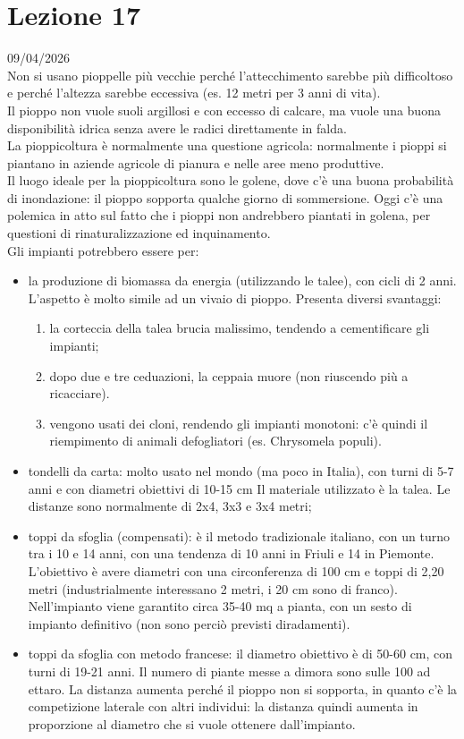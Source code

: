 \section{Lezione 17} \hfill 09/04/2026\\
Non si usano pioppelle più vecchie perché l'attecchimento sarebbe più difficoltoso e perché l'altezza sarebbe eccessiva (es. 12 metri per 3 anni di vita).\\
Il pioppo non vuole suoli argillosi e con eccesso di calcare, ma vuole una buona disponibilità idrica senza avere le radici direttamente in falda.\\
La pioppicoltura è normalmente una questione agricola: normalmente i pioppi si piantano in aziende agricole di pianura e nelle aree meno produttive.\\
Il luogo ideale per la pioppicoltura sono le golene, dove c'è una buona probabilità di inondazione: il pioppo sopporta qualche giorno di sommersione. Oggi c'è una polemica in atto sul fatto che i pioppi non andrebbero piantati in golena, per questioni di rinaturalizzazione ed inquinamento.\\
Gli impianti potrebbero essere per:
\begin{itemize}[nosep]
    \item la produzione di biomassa da energia (utilizzando le talee), con cicli di 2 anni. L'aspetto è molto simile ad un vivaio di pioppo. Presenta diversi svantaggi:
    \begin{enumerate}[nosep]
        \item la corteccia della talea brucia malissimo, tendendo a cementificare gli impianti;
        \item dopo due e tre ceduazioni, la ceppaia muore (non riuscendo più a ricacciare).
        \item vengono usati dei cloni, rendendo gli impianti monotoni: c'è quindi il riempimento di animali defogliatori (es. Chrysomela populi). 
    \end{enumerate} 
    \item tondelli da carta: molto usato nel mondo (ma poco in Italia), con turni di 5-7 anni e con diametri obiettivi di 10-15 cm Il materiale utilizzato è la talea. Le distanze sono normalmente di 2x4, 3x3 e 3x4 metri;
    \item toppi da sfoglia (compensati): è il metodo tradizionale italiano, con un turno tra i 10 e 14 anni, con una tendenza di 10 anni in Friuli e 14 in Piemonte. L'obiettivo è avere diametri con una circonferenza di 100 cm e toppi di 2,20 metri (industrialmente interessano 2 metri, i 20 cm sono di franco). Nell'impianto viene garantito circa 35-40 mq a pianta, con un sesto di impianto definitivo (non sono perciò previsti diradamenti).
    \item toppi da sfoglia con metodo francese: il diametro obiettivo è di 50-60 cm, con turni di 19-21 anni. Il numero di piante messe a dimora sono sulle 100 ad ettaro. La distanza aumenta perché il pioppo non si sopporta, in quanto c'è la competizione laterale con altri individui: la distanza quindi aumenta in proporzione al diametro che si vuole ottenere dall'impianto.
\end{itemize}
